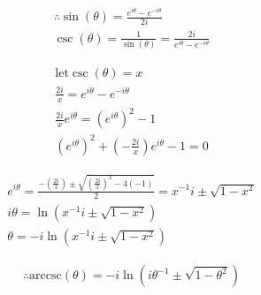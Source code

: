 \documentclass{../../style}
\begin{document}
\eulerformula

\begin{gather*}
	\therefore \sin(\theta) = \frac{e^{i\theta} - e^{-i\theta}}{2i} \\
	\csc(\theta) = \frac{1}{\sin(\theta)} = \frac{2i}{e^{i\theta} - e^{-i\theta}}
\end{gather*}

\begin{gather*}
	\text{let} \csc(\theta) = x \\
	\frac{2i}{x} = e^{i\theta} - e^{-i\theta} \\
	\frac{2i}{x}e^{i\theta} = (e^{i\theta})^2 - 1 \\ 
	(e^{i\theta})^2 + (-\frac{2i}{x})e^{i\theta} - 1 = 0
\end{gather*}

\begin{gather*}
	e^{i\theta} = \frac{-(\frac{2i}{x}) \pm \sqrt{(\frac{2i}{x})^2 - 4(-1)}}{2} = x^{-1}i \pm \sqrt{1 - x^2} \\
	i\theta = \ln(x^{-1}i \pm \sqrt{1 - x^2}) \\
	\theta = -i\ln(x^{-1}i \pm \sqrt{1 - x^2})
\end{gather*}

\begin{gather*}
	\therefore \text{arccsc}(\theta) = -i\ln(i\theta^{-1} \pm \sqrt{1 -\theta^2})
\end{gather*}
\end{document}
